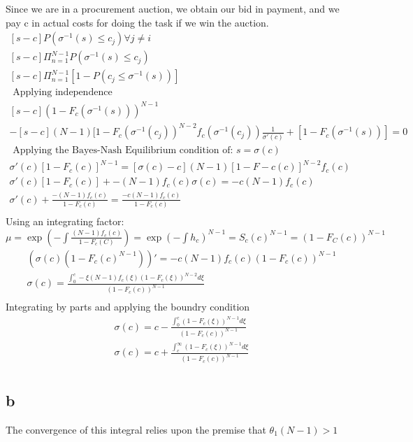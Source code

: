 \documentclass[10pt]{paper}
\begin{document}
Since we are in a procurement auction, we obtain our bid in payment,
and we pay c in actual costs for doing the task if we win the auction.
\begin{align*}
  \left [ s - c \right ] P( \sigma^{-1}(s) \leq c_j ) \forall j \neq i\\
  \left [ s - c \right ] \Pi_{n=1}^{N-1} P( \sigma^{-1}(s) \leq c_j )\\
  \left [ s - c \right ] \Pi_{n=1}^{N-1} \left [ 1 -  P( c_j \leq \sigma^{-1}(s) ) \right ]\\
  \text{ Applying independence }\\
  \left [ s - c \right ] \left ( 1 - F_c(\sigma^{-1}(s)) \right )^{N-1}\\
  -[s-c](N-1)[ 1- F_c(\sigma^{-1}(c_j))^{N-2}f_c(\sigma^{-1}(c_j))\frac{1}{\sigma'(c)} + [1-F_c(\sigma^{-1}(s))] = 0\\
  \text{ Applying the Bayes-Nash Equilibrium condition of: } s = \sigma(c)\\
  \sigma'(c)[ 1- F_c(c)]^{N-1} = [\sigma(c) - c ] (N-1) [ 1 - F-c(c)]^{N-2} f_c(c)\\
  \sigma'(c)[1-F_c(c)] + -(N-1)f_c(c)\sigma(c) = -c(N-1)f_c(c)\\
  \sigma'(c) + \frac{-(N-1)f_c(c)}{1-F_c(c)} = \frac{-c(N-1)f_c(c)}{1-F_c(c)}\\
\end{align*}
Using an integrating factor: $\mu = \exp \left( -\int
\frac{(N-1)f_c(c)}{1-F_c(C)} \right) = \exp ( - \int h_c )^{N-1} = S_c(c)^{N-1} = (1 - F_C(c))^{N-1}$
\begin{align*}
  \left ( \sigma(c) (1-F_c(c)^{N-1}) \right )' = -c(N-1)f_c(c)(1-F_c(c))^{N-1}\\
  \sigma(c) = \frac{\int_0^c -\xi (N-1)f_c(\xi)(1-F_c(\xi))^{N-2}d\xi}{(1-F_c(c))^{N-1}}\\
\end{align*}
Integrating by parts and applying the boundry condition
\begin{align*}
  \sigma(c) = c - \frac{ \int_{0}^c( 1- F_c(\xi) )^{N-1}d\xi }{(1-F_c(c))^{N-1}}\\
  \sigma(c) = c + \frac{ \int_c^\infty ( 1- F_c(\xi) )^{N-1} d\xi }{(1-F_c(c))^{N-1}}\\
\end{align*}

\subsection*{b}
The convergence of this integral relies upon the premise that
$\theta_1(N-1) > 1$
\end{document}
